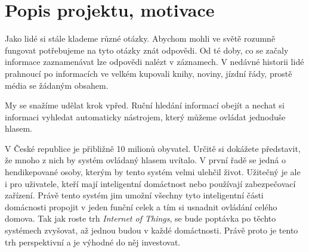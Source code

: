 \documentclass[12pt,a4paper]{article}
\begin{document}
\newpage
\pagestyle{plain}     %
\setcounter{page}{1}
\addtolength{\voffset}{-3cm}
\addtolength{\headheight}{2cm}

\pagestyle{fancy}
\lfoot{}
\cfoot{\thepage}
\rfoot{}
\renewcommand{\headrulewidth}{0.4pt}


\section*{Popis projektu, motivace}
Jako lidé si stále klademe různé otázky. Abychom mohli ve světě rozumně fungovat potřebujeme na tyto otázky znát odpovědi. Od té doby, co se začaly informace zaznamenávat lze odpovědi nalézt v záznamech. V nedávné historii lidé prahnoucí po informacích ve velkém kupovali knihy, noviny, jízdní řády, prostě média se žádaným obsahem. 

My se snažíme udělat krok vpřed. Ruční hledání informací obejít a nechat si informaci vyhledat automaticky nástrojem, který můžeme ovládat jednoduše hlasem.

V České republice je přibližně 10 milionů obyvatel. Určitě si dokážete představit, že mnoho z nich by systém ovládaný hlasem uvítalo. V první řadě se jedná o hendikepované osoby, kterým by tento systém velmi ulehčil život. Užitečný je ale i pro uživatele, kteří mají inteligentní domáctnost nebo používají zabezpečovací zařízení. Právě tento systém jim umožní všechny tyto inteligentní části domácnosti propojit v jeden funční celek a tím si usnadnit ovládání celého domova. Tak jak roste trh \textit{Internet of Things}, se bude poptávka po těchto systémech zvyšovat, až jednou budou v každé domáctnosti. Právě proto je tento trh perspektivní a je výhodné do něj investovat.
\end{document}

